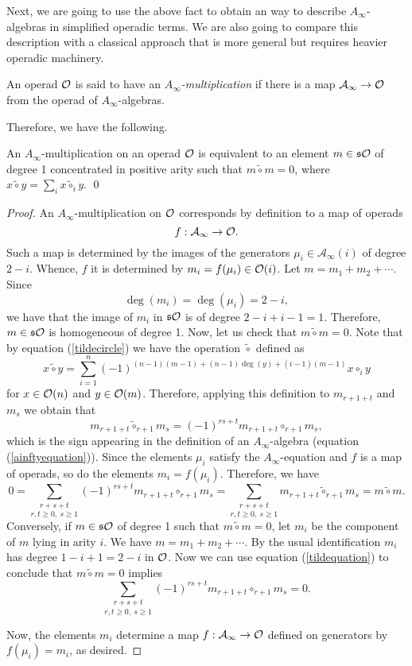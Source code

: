 \documentclass[join.tex]{subfiles}
\begin{document}
Next, we are going to use the above fact to obtain an way to describe $A_\infty$-algebras in simplified operadic terms. We are also going to compare this description with a classical approach that is more general but requires heavier operadic machinery. 


\begin{defin}\label{ainftymult}
An operad ${\mathcal O}$ is said to have an \emph{$A_\infty$-multiplication} if there is a map $\mathcal{A}_\infty\to{\mathcal O}$ from the operad of $A_\infty$-algebras.
\end{defin}

 Therefore, we have the following. 

\begin{lem}\label{twisting}
An $A_\infty$-multiplication on an operad ${\mathcal O}$ is equivalent to an element $m\in\mathfrak{s}{\mathcal O}$ of degree 1 concentrated in positive arity such that $m\tilde{\circ}m=0$, where $x\tilde{\circ} y=\sum_i x\tilde{\circ}_i y$. \qed
\end{lem}
\begin{proof}
An $A_\infty$-multiplication on ${\mathcal O}$ corresponds by definition to a map of operads \[f:\mathcal{A}_\infty\to{\mathcal O}.\] Such a map is determined by the images of the generators $\mu_i\in\mathcal{A}_\infty(i)$ of degree $2-i$. Whence, $f$ it is determined by $m_i=f(\mu_i)\in{\mathcal O}(i)$. Let $m=m_1+m_2+\cdots$. Since \[\deg(m_i)=\deg(\mu_i)=2-i,\]
we have that the image of $m_i$ in $\mathfrak{s}{\mathcal O}$ is of degree $2-i+i-1=1$. Therefore, $m\in\mathfrak{s}{\mathcal O}$ is homogeneous of degree 1. Now, let us check that $m\tilde{\circ}m=0$. Note that by equation (\ref{tildecircle}) we have the operation $\tilde{\circ}$ defined as
\[x\tilde{\circ}y=\sum_{i=1}^n(-1)^{(n-1)(m-1)+(n-1)\deg(y)+(i-1)(m-1)}x\circ_i y\]
for $x\in{\mathcal O}(n)$ and $y\in{\mathcal O}(m)$. Therefore, applying this definition to $m_{r+1+t}$ and $m_s$ we obtain that
\begin{equation}\label{tildequation}
m_{r+1+t}\tilde{\circ }_{r+1}m_s=(-1)^{rs+t}m_{r+1+t}\circ_{r+1} m_s,
\end{equation}
which is the sign appearing in the definition of an $A_\infty$-algebra (equation (\ref{ainftyequation})). Since the elements $\mu_i$ satisfy the $A_\infty$-equation and $f$ is a map of operads, so do the elements $m_i=f(\mu_i)$. Therefore, we have
\[0=\underset{r,t\geq 0,\ s\geq 1}{\sum_{r+s+t}}(-1)^{rs+t}m_{r+1+t}\circ_{r+1} m_s=\underset{r,t\geq 0,\ s\geq 1}{\sum_{r+s+t}}m_{r+1+t}\tilde{\circ}_{r+1}m_s=m\tilde{\circ}m.\] 
Conversely, if $m\in\mathfrak{s}{\mathcal O}$ of degree 1 such that $m\tilde{\circ}m=0$, let $m_i$ be the component of $m$ lying in arity $i$. We have $m=m_1+m_2+\cdots$. By the usual identification $m_i$ has degree $1-i+1=2-i$ in ${\mathcal O}$. Now we can use equation (\ref{tildequation}) to conclude that $m\tilde{\circ}m=0$ implies 
\[\underset{r,t\geq 0,\ s\geq 1}{\sum_{r+s+t}}(-1)^{rs+t}m_{r+1+t}\circ_{r+1} m_s=0.\]

Now, the elements $m_i$ determine a map $f:\mathcal{A}_\infty\to{\mathcal O}$ defined on generators by $f(\mu_i)=m_i$, as desired. 
\end{proof}
\end{document}
